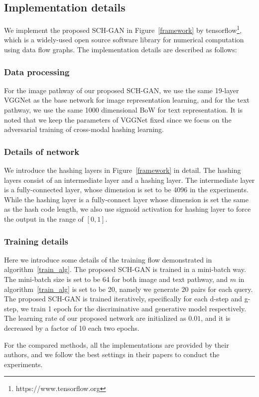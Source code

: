 \documentclass[journal]{IEEEtran}
\begin{document}
\subsection{Implementation details}
We implement the proposed SCH-GAN in Figure~\ref{framework} by tensorflow\footnote{https://www.tensorflow.org}, which is a widely-used open source software library for numerical computation using data flow graphs. The implementation details are described as follows:
\subsubsection{Data processing} For the image pathway of our proposed SCH-GAN, we use the same 19-layer VGGNet as the base network for image representation learning, and for the text pathway, we use the same 1000 dimensional BoW for text representation. It is noted that we keep the parameters of VGGNet fixed since we focus on the adversarial training of cross-modal hashing learning.
\subsubsection{Details of network} We introduce the hashing layers in Figure~\ref{framework} in detail. The hashing layers consist of an intermediate layer and a hashing layer. The intermediate layer is a fully-connected layer, whose dimension is set to be 4096 in the experiments. While the hashing layer is a fully-connect layer whose dimension is set the same as the hash code length, we also use sigmoid activation for hashing layer to force the output in the range of $[0,1]$.
\subsubsection{Training details} Here we introduce some details of the training flow demonstrated in algorithm~\ref{train_alg}. The proposed SCH-GAN is trained in a mini-batch way. The mini-batch size is set to be 64 for both image and text pathway, and $m$ in algorithm~\ref{train_alg} is set to be 20, namely we generate 20 pairs for each query. The proposed SCH-GAN is trained iteratively, specifically for each d-step and g-step, we train 1 epoch for the discriminative and generative model respectively. The learning rate of our proposed network are initialized as $0.01$, and it is decreased by a factor of 10 each two epochs.

For the compared methods, all the implementations are provided by their authors, and we follow the best settings in their papers to conduct the experiments.
\end{document}
